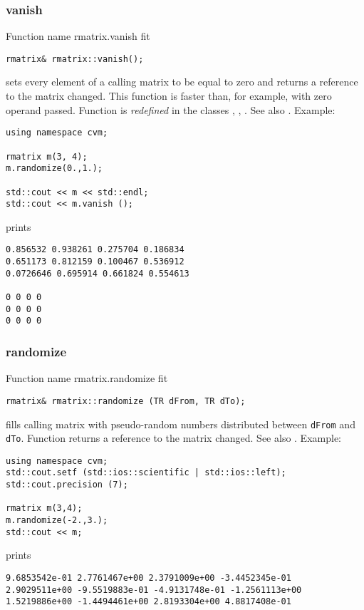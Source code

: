 \subsubsection{vanish}
Function%
\pdfdest name {rmatrix.vanish} fit
\begin{verbatim}
rmatrix& rmatrix::vanish();
\end{verbatim}
sets every element of a calling matrix to be equal to zero
and returns a reference to
the matrix changed. This function is faster
than, for example,
with zero operand passed.
Function is \emph{redefined} in the classes
, ,
.
See also .
Example:
\begin{Verbatim}
using namespace cvm;

rmatrix m(3, 4);
m.randomize(0.,1.);

std::cout << m << std::endl;
std::cout << m.vanish ();
\end{Verbatim}
prints
\begin{Verbatim}
0.856532 0.938261 0.275704 0.186834
0.651173 0.812159 0.100467 0.536912
0.0726646 0.695914 0.661824 0.554613

0 0 0 0
0 0 0 0
0 0 0 0
\end{Verbatim}
\newpage




\subsubsection{randomize}
Function%
\pdfdest name {rmatrix.randomize} fit
\begin{verbatim}
rmatrix& rmatrix::randomize (TR dFrom, TR dTo);
\end{verbatim}
fills  calling matrix with pseudo-random numbers distributed between
\verb"dFrom" and \verb"dTo".
Function
returns a reference to the matrix changed.
See also
.
Example:
\begin{Verbatim}
using namespace cvm;
std::cout.setf (std::ios::scientific | std::ios::left);
std::cout.precision (7);

rmatrix m(3,4);
m.randomize(-2.,3.);
std::cout << m;
\end{Verbatim}
prints
\begin{Verbatim}
9.6853542e-01 2.7761467e+00 2.3791009e+00 -3.4452345e-01
2.9029511e+00 -9.5519883e-01 -4.9131748e-01 -1.2561113e+00
1.5219886e+00 -1.4494461e+00 2.8193304e+00 4.8817408e-01
\end{Verbatim}
\newpage

